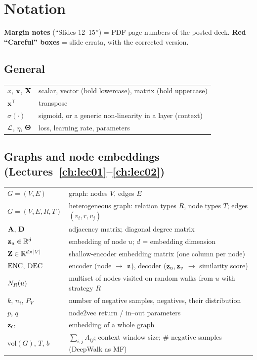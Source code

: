 \chapter{Notation}\label{app:notation}

\textbf{Margin notes} (``Slides 12--15'') = PDF page numbers of the posted deck.
\textbf{Red ``Careful'' boxes} = slide errata, with the corrected version.

\section{General}
\begin{tabularx}{\textwidth}{@{}l X@{}}
  \toprule
  $x$, $\mathbf{x}$, $\mathbf{X}$ & scalar, vector (bold lowercase), matrix (bold uppercase) \\
  $\mathbf{x}^{\top}$ & transpose \\
  $\sigma(\cdot)$ & sigmoid, or a generic non-linearity in a layer (context) \\
  $\mathcal{L}$, $\eta$, $\bm{\Theta}$ & loss, learning rate, parameters \\
  \bottomrule
\end{tabularx}

\section{Graphs and node embeddings (Lectures~\ref{ch:lec01}--\ref{ch:lec02})}
\begin{tabularx}{\textwidth}{@{}l X@{}}
  \toprule
  $G=(V,E)$ & graph: nodes $V$, edges $E$ \\
  $G=(V,E,R,T)$ & heterogeneous graph: relation types $R$, node types $T$; edges $(v_i,r,v_j)$ \\
  $\mathbf{A}$, $\mathbf{D}$ & adjacency matrix; diagonal degree matrix \\
  $\mathbf{z}_u\in\mathbb{R}^d$ & embedding of node $u$; $d$ = embedding dimension \\
  $\mathbf{Z}\in\mathbb{R}^{d\times|V|}$ & shallow-encoder embedding matrix (one column per node) \\
  $\operatorname{ENC}$, $\operatorname{DEC}$ & encoder (node $\to$ $\mathbf{z}$), decoder ($\mathbf{z}_u,\mathbf{z}_v$ $\to$ similarity score) \\
  $N_R(u)$ & multiset of nodes visited on random walks from $u$ with strategy $R$ \\
  $k$, $n_i$, $P_V$ & number of negative samples, negatives, their distribution \\
  $p$, $q$ & node2vec return / in--out parameters \\
  $\mathbf{z}_G$ & embedding of a whole graph \\
  $\mathrm{vol}(G)$, $T$, $b$ & $\sum_{i,j}A_{ij}$; context window size; \# negative samples (DeepWalk as MF) \\
  \bottomrule
\end{tabularx}

